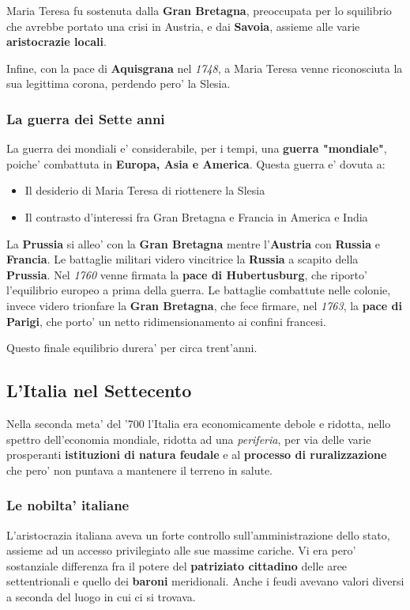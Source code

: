 \documentclass{article}
\begin{document}
{{    Maria Teresa fu sostenuta dalla \textbf{Gran Bretagna}, preoccupata per lo squilibrio che avrebbe portato una crisi in Austria, e dai \textbf{Savoia}, assieme alle varie \textbf{aristocrazie locali}.

    Infine, con la pace di \textbf{Aquisgrana} nel \textit{1748}, a Maria Teresa venne riconosciuta la sua legittima corona, perdendo pero' la Slesia.

    \subsubsection{La guerra dei Sette anni}
    La guerra dei mondiali e' considerabile, per i tempi, una \textbf{guerra "mondiale"}, poiche' combattuta in \textbf{Europa, Asia e America}. Questa guerra e' dovuta a:

    \begin{itemize}
      \item Il desiderio di Maria Teresa di riottenere la Slesia
      \item Il contrasto d'interessi fra Gran Bretagna e Francia in America e India
    \end{itemize}

    La \textbf{Prussia} si alleo' con la \textbf{Gran Bretagna} mentre l'\textbf{Austria} con \textbf{Russia} e \textbf{Francia}. Le battaglie militari videro vincitrice la \textbf{Russia} a scapito della \textbf{Prussia}. Nel \textit{1760} venne firmata la \textbf{pace di Hubertusburg}, che riporto' l'equilibrio europeo a prima della guerra. Le battaglie combattute nelle colonie, invece videro trionfare la \textbf{Gran Bretagna}, che fece firmare, nel \textit{1763}, la \textbf{pace di Parigi}, che porto' un netto ridimensionamento ai confini francesi.

    Questo finale equilibrio durera' per circa trent'anni.

    \subsection{L'Italia nel Settecento}
    Nella seconda meta' del '700 l'Italia era economicamente debole e ridotta, nello spettro dell'economia mondiale, ridotta ad una \textit{periferia}, per via delle varie prosperanti \textbf{istituzioni di natura feudale} e al \textbf{processo di ruralizzazione} che pero' non puntava a mantenere il terreno in salute.

    \subsubsection{Le nobilta' italiane}
    L'aristocrazia italiana aveva un forte controllo sull'amministrazione dello stato, assieme ad un accesso privilegiato alle sue massime cariche. Vi era pero' sostanziale differenza fra il potere del \textbf{patriziato cittadino} delle aree settentrionali e quello dei \textbf{baroni} meridionali. Anche i feudi avevano valori diversi a seconda del luogo in cui ci si trovava.

}}
\end{document}
